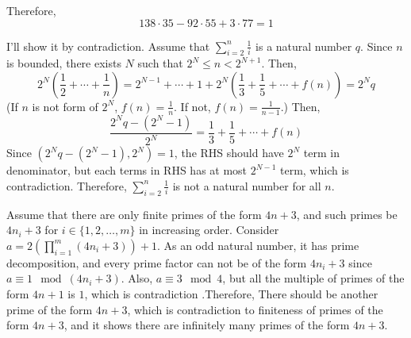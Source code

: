 \documentclass[12pt]{article}
\newenvironment{problem}[2][Problem]{\begin{trivlist}
\item[\hskip \labelsep {\bfseries #1}\hskip \labelsep {\bfseries #2.}]}{\end{trivlist}}
\begin{document}
Therefore,
\begin{equation*}
138\cdot 35-92 \cdot 55+3\cdot 77=1
\end{equation*}

\begin{problem}{4}
\end{problem}
I'll show it by contradiction. Assume that $\sum\limits_{i=2}^n \frac{1}{i}$ is a natural number $q$. Since $n$ is bounded, there exists $N$ such that $2^N\leq n < 2^{N+1}$. Then,
\begin{equation*}
2^N\left(\frac{1}{2}+\cdots +\frac{1}{n}\right)=2^{N-1}+\cdots+1+2^N\left(\frac{1}{3}+\frac{1}{5}+\cdots + f(n)\right)=2^N q
\end{equation*}
(If $n$ is not form of $2^N$, $f(n)=\frac{1}{n}$. If not, $f(n)=\frac{1}{n-1}$.)
Then,
\begin{equation*}
\frac{2^N q-(2^{N}-1)}{2^N}=\frac{1}{3}+\frac{1}{5}+\cdots+f(n)
\end{equation*}
Since $(2^N q-(2^{N}-1), 2^N)=1$, the RHS should have $2^N$ term in denominator, but each terms in RHS has at most $2^{N-1}$ term, which is contradiction. Therefore, $\sum\limits_{i=2}^n \frac{1}{i}$ is not a natural number for all $n$.



\newpage
\begin{problem}{5}
\end{problem}
Assume that there are only finite primes of the form $4n+3$, and such primes be $4n_i+3$ for $i\in \{1, 2, \ldots, m\}$ in increasing order. Consider $a=2\left(\prod_{i=1}^m (4n_i+3)\right)+1$. As an odd natural number, it has prime decomposition, and every prime factor can not be of the form $4n_i+3$ since $a \equiv 1\mod (4n_i+3)$. Also, $a \equiv 3\mod 4$, but all the multiple of primes of the form $4n+1$ is $1$, which is contradiction .Therefore, There should be another prime of the form $4n+3$, which is contradiction to finiteness of primes of the form $4n+3$, and it shows there are infinitely many primes of the form $4n+3$.
\end{document}
